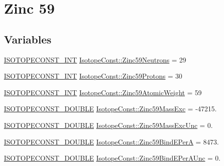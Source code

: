 \hypertarget{group___isotope_const-_zinc-_zn59}{}\section{Zinc 59}
\label{group___isotope_const-_zinc-_zn59}
\subsection*{Variables}
\begin{DoxyCompactItemize}
\item 
\mbox{\hyperlink{group___isotope_const-_macros_ga5f18360b3e99483a35c32d789e62621c}{I\+S\+O\+T\+O\+P\+E\+C\+O\+N\+S\+T\+\_\+\+I\+NT}} \mbox{\hyperlink{group___isotope_const-_zinc-_zn59_ga657714b3651e42c7c1b0ba7cc4bdc9fa}{Isotope\+Const\+::\+Zinc59\+Neutrons}} = 29
\item 
\mbox{\hyperlink{group___isotope_const-_macros_ga5f18360b3e99483a35c32d789e62621c}{I\+S\+O\+T\+O\+P\+E\+C\+O\+N\+S\+T\+\_\+\+I\+NT}} \mbox{\hyperlink{group___isotope_const-_zinc-_zn59_ga62c928cce9ce644156f63032f9edb33d}{Isotope\+Const\+::\+Zinc59\+Protons}} = 30
\item 
\mbox{\hyperlink{group___isotope_const-_macros_ga5f18360b3e99483a35c32d789e62621c}{I\+S\+O\+T\+O\+P\+E\+C\+O\+N\+S\+T\+\_\+\+I\+NT}} \mbox{\hyperlink{group___isotope_const-_zinc-_zn59_ga9700a77a2acf23f4171a0e6c1b88e93a}{Isotope\+Const\+::\+Zinc59\+Atomic\+Weight}} = 59
\item 
\mbox{\hyperlink{group___isotope_const-_macros_ga8f45a7272ce02c0b4c65c44636ed719a}{I\+S\+O\+T\+O\+P\+E\+C\+O\+N\+S\+T\+\_\+\+D\+O\+U\+B\+LE}} \mbox{\hyperlink{group___isotope_const-_zinc-_zn59_gaaef0dbf7d15c403c2e77ed966bca6046}{Isotope\+Const\+::\+Zinc59\+Mass\+Exc}} = -\/47215.
\item 
\mbox{\hyperlink{group___isotope_const-_macros_ga8f45a7272ce02c0b4c65c44636ed719a}{I\+S\+O\+T\+O\+P\+E\+C\+O\+N\+S\+T\+\_\+\+D\+O\+U\+B\+LE}} \mbox{\hyperlink{group___isotope_const-_zinc-_zn59_gafc90c5c7841dd261371da17f3d0825ad}{Isotope\+Const\+::\+Zinc59\+Mass\+Exc\+Unc}} = 0.
\item 
\mbox{\hyperlink{group___isotope_const-_macros_ga8f45a7272ce02c0b4c65c44636ed719a}{I\+S\+O\+T\+O\+P\+E\+C\+O\+N\+S\+T\+\_\+\+D\+O\+U\+B\+LE}} \mbox{\hyperlink{group___isotope_const-_zinc-_zn59_ga38d9c72084aa6daacc4f3e2baf85eaf0}{Isotope\+Const\+::\+Zinc59\+Bind\+E\+PerA}} = 8473.
\item 
\mbox{\hyperlink{group___isotope_const-_macros_ga8f45a7272ce02c0b4c65c44636ed719a}{I\+S\+O\+T\+O\+P\+E\+C\+O\+N\+S\+T\+\_\+\+D\+O\+U\+B\+LE}} \mbox{\hyperlink{group___isotope_const-_zinc-_zn59_ga96eb6eed891ff4e42e84388cea2dce76}{Isotope\+Const\+::\+Zinc59\+Bind\+E\+Per\+A\+Unc}} = 0.

\end{DoxyCompactItemize}
